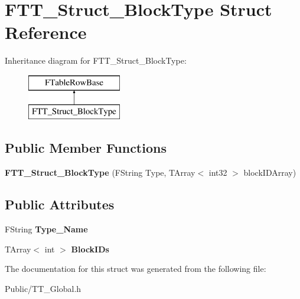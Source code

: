\hypertarget{struct_f_t_t___struct___block_type}{}\section{F\+T\+T\+\_\+\+Struct\+\_\+\+Block\+Type Struct Reference}
\label{struct_f_t_t___struct___block_type}
Inheritance diagram for F\+T\+T\+\_\+\+Struct\+\_\+\+Block\+Type\+:\begin{figure}[H]
\begin{center}
\leavevmode
\includegraphics[height=2.000000cm]{struct_f_t_t___struct___block_type}
\end{center}
\end{figure}
\subsection*{Public Member Functions}
\begin{DoxyCompactItemize}
\item 
\mbox{\label{struct_f_t_t___struct___block_type_a46e35f4e625cd5e300aa5362e47a2940}} 
{\bfseries F\+T\+T\+\_\+\+Struct\+\_\+\+Block\+Type} (F\+String Type, T\+Array$<$ int32 $>$ block\+I\+D\+Array)
\end{DoxyCompactItemize}
\subsection*{Public Attributes}
\begin{DoxyCompactItemize}
\item 
\mbox{\label{struct_f_t_t___struct___block_type_a72ac9ab5ff31fddf06913a6837d85ad6}} 
F\+String {\bfseries Type\+\_\+\+Name}
\item 
\mbox{\label{struct_f_t_t___struct___block_type_a80d65b9bd8a31b36f2d943898bd5a9b3}} 
T\+Array$<$ int $>$ {\bfseries Block\+I\+Ds}
\end{DoxyCompactItemize}


The documentation for this struct was generated from the following file\+:\begin{DoxyCompactItemize}
\item 
Public/T\+T\+\_\+\+Global.\+h\end{DoxyCompactItemize}
